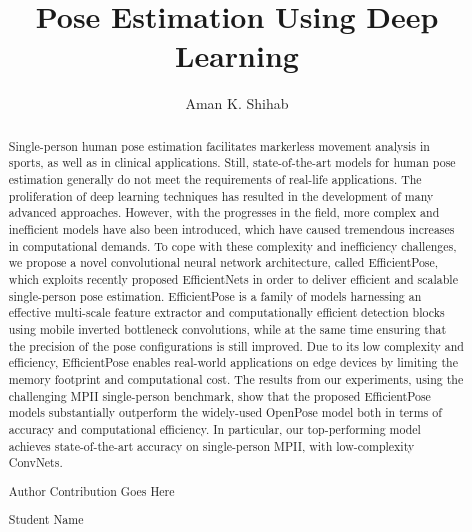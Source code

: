 \documentclass{fisatprojectfinal}
\title{Pose Estimation Using Deep Learning}
\author{Aman K. Shihab}
\begin{document}
\maketitle
\makecert

\newpage
{}
\setcounter{page}{1}
\thispagestyle{plain}
\renewcommand\abstractname{ABSTRACT}
\begin{abstract}
\vspace{5cm}
Single-person human pose estimation facilitates markerless movement analysis in sports, as well as in clinical applications.
Still, state-of-the-art models for human pose estimation generally do not meet the requirements of real-life applications.
The proliferation of deep learning techniques has resulted in the development of many advanced approaches. However,
with the progresses in the field, more complex and inefficient models have also been introduced, which have caused
tremendous increases in computational demands. To cope with these complexity and inefficiency challenges, we propose
a novel convolutional neural network architecture, called EfficientPose, which exploits recently proposed EfficientNets
in order to deliver efficient and scalable single-person pose estimation. EfficientPose is a family of models harnessing
an effective multi-scale feature extractor and computationally efficient detection blocks using mobile inverted bottleneck
convolutions, while at the same time ensuring that the precision of the pose configurations is still improved. Due to its low
complexity and efficiency, EfficientPose enables real-world applications on edge devices by limiting the memory footprint
and computational cost. The results from our experiments, using the challenging MPII single-person benchmark, show that
the proposed EfficientPose models substantially outperform the widely-used OpenPose model both in terms of accuracy and
computational efficiency. In particular, our top-performing model achieves state-of-the-art accuracy on single-person MPII,
with low-complexity ConvNets.
\end{abstract}



\newpage
\renewcommand\abstractname{Contribution by Author}
\thispagestyle{plain}
\begin{abstract}
\vspace{5cm}
Author Contribution  Goes Here
\vspace{1cm}
\begin{flushright}
Student Name
\end{flushright}
\end{abstract}
\end{document}
